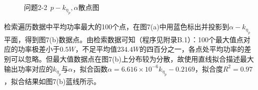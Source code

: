 \documentclass{article}
\numberwithin{equation}{subsection}
\begin{document}
\begin{figure}[htbp]
    \centering
    \quad
    \caption{问题2-2$\;\,p-k_{\eta _p},\alpha$散点图}
\end{figure}
检索遍历数据中平均功率最大的100个点，在图7(a)中用蓝色标出并投影到$\alpha-k_{\eta _p}$平面，得到图7(b)数据点。由检索数据可知（程序见附录B.1）：100个最大值点对应的功率极差小于$0.5W$，不足平均值$234.4W$的四百分之一，各点处平均功率的差别可以忽略。但最大值数据点在图7(b)上分布较为分散，故使用直线拟合描述最大输出功率对应的$k_{\eta _p}$与$\alpha$，拟合函数$\alpha=6.616\times 10^{-6}k_{\eta_p}-0.2169$，拟合度$R^2=0.97$，拟合结果如图7(b)蓝线所示。
\end{document}
